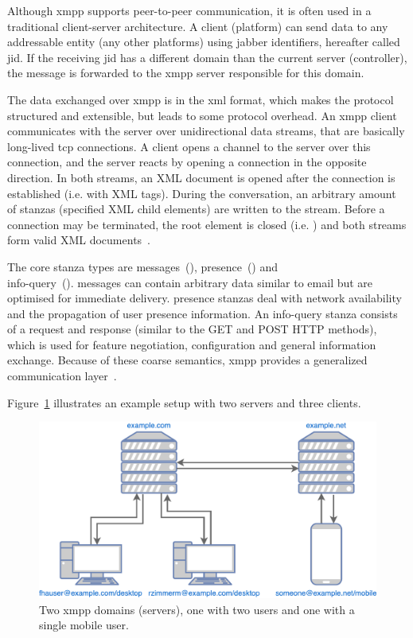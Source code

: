 Although \gls{xmpp} supports peer-to-peer communication, it is often used in a traditional client-server architecture.
A client (\gls{platform}) can send data to any addressable entity (any other \glspl{platform}) using \Gls{jabber} identifiers, hereafter called \gls{jid}.
If the receiving \gls{jid} has a different domain than the current server (\gls{controller}), the message is forwarded to the \gls{xmpp} server responsible for this domain.~\cite{rfc6120}

The data exchanged over \gls{xmpp} is in the \gls{xml} format, which makes the protocol structured and extensible, but leads to some protocol overhead.
An \gls{xmpp} client communicates with the server over unidirectional data streams, that are basically long-lived \gls{tcp} connections.
A client opens a channel to the server over this connection, and the server reacts by opening a connection in the opposite direction.
In both streams, an XML document is opened after the connection is established (i.e. with  XML tags).
During the conversation, an arbitrary amount of \glspl{stanza} (specified XML child elements) are written to the stream.
Before a connection may be terminated, the root element is closed (i.e. ) and both streams form valid XML documents~\cite{rfc6120}\cite{professional-xmpp}.

The core \gls{stanza} types are \glspl{message}~(), \gls{presence}~() and\\
\gls{info-query}~().
\Glspl{message} can contain arbitrary data similar to email but are optimised for immediate delivery.
\Gls{presence} \glspl{stanza} deal with network availability and the propagation of user presence information.
An \gls{info-query} \gls{stanza} consists of a request and response (similar to the GET and POST HTTP methods), which is used for feature negotiation, configuration and general information exchange.
Because of these coarse semantics, \gls{xmpp} provides a generalized communication layer~\cite{rfc6120}\cite{ieee-xplore-stream-xml-xmpp}.

Figure~\ref{fig:xmpp-overview} illustrates an example setup with two servers and three clients.

\begin{figure}[h]
	\centering
	\includegraphics[width=0.8\linewidth]{resources/xmpp_overview.pdf}
	\caption{Two \gls{xmpp} domains (servers), one with two users and one with a single mobile user.}
	\label{fig:xmpp-overview}
\end{figure}

